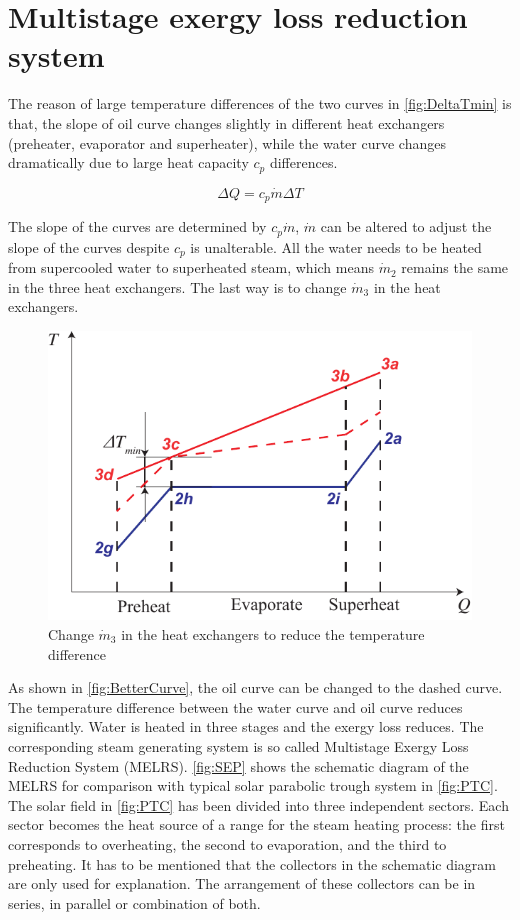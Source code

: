 \section{Multistage exergy loss reduction system}\label{sec:melrs}
The reason of large temperature differences of the two curves in \autoref{fig:DeltaTmin} is that, the slope of oil curve changes slightly in different heat exchangers (preheater, evaporator and superheater), while the water curve changes dramatically due to large heat capacity $c_p$ differences.

\begin{equation}
  \Delta Q =  c_p\dot{m} \Delta T
\end{equation}

The slope of the curves are determined by $c_p\dot{m}$, $\dot{m}$ can be altered to adjust the slope of the curves despite $c_p$ is unalterable. All the water needs to be heated from supercooled water to superheated steam, which means $\dot{m}_2$ remains the same in the three heat exchangers. The last way is to change $\dot{m}_3$ in the heat exchangers.

\begin{figure}[htbp]
\centering
	\includegraphics[width = 0.5\columnwidth]{fig/BetterCurve}
	\caption{Change $\dot{m}_3$ in the heat exchangers to reduce the temperature difference}
	\label{fig:BetterCurve}
\end{figure}

As shown in \autoref{fig:BetterCurve}, the oil curve can be changed to the dashed curve. The temperature difference between the water curve and oil curve reduces significantly. Water is heated in three stages and the exergy loss reduces. The corresponding steam generating system is so called Multistage Exergy Loss Reduction System (MELRS).
\autoref{fig:SEP} shows the schematic diagram of the MELRS for comparison with typical solar parabolic trough system in \autoref{fig:PTC}. The solar field in \autoref{fig:PTC} has been divided into three independent sectors. Each sector becomes the heat source of a range for the steam heating process: the first corresponds to overheating, the second to evaporation, and the third to preheating. 
It has to be mentioned that the collectors in the schematic diagram are only used for explanation. The arrangement of these collectors can be in series, in parallel or combination of both.

